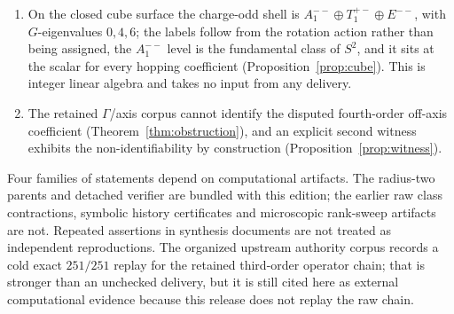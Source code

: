 \documentclass[11pt]{article}
\theoremstyle{plain}
\theoremstyle{definition}
\theoremstyle{remark}
\begin{document}
\begin{enumerate}
  the vacuum-mediated all-pairs term must first be reorganised or cancelled.
\item On the closed cube surface the charge-odd shell is
  $A_1^{--}\oplus T_1^{+-}\oplus E^{--}$, with $G$-eigenvalues $0,4,6$; the
  labels follow from the rotation action rather than being assigned, the
  $A_1^{--}$ level is the fundamental class of $S^2$, and it sits at the scalar
  for every hopping coefficient (Proposition~\ref{prop:cube}). This is integer
  linear algebra and takes no input from any delivery.
\item The retained $\Gamma$/axis corpus cannot identify the disputed
  fourth-order off-axis coefficient (Theorem~\ref{thm:obstruction}), and an
  explicit second witness exhibits the non-identifiability by construction
  (Proposition~\ref{prop:witness}).
\end{enumerate}

Four families of statements depend on computational artifacts. The radius-two
parents and detached verifier are bundled with this edition; the earlier raw
class contractions, symbolic history certificates and microscopic rank-sweep
artifacts are not. Repeated assertions in synthesis documents are not treated
as independent reproductions. The organized upstream authority corpus records a cold exact
$251/251$ replay for the retained third-order operator chain; that is stronger
than an unchecked delivery, but it is still cited here as external
computational evidence because this release does not replay the raw chain.
\end{document}
